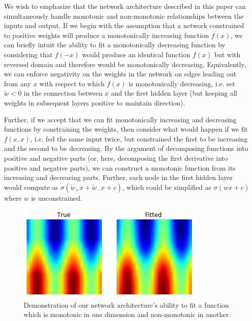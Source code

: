     We wish to emphasize that the network architecture described in this paper can simultaneously handle monotonic and non-monotonic relationships between the inputs and output. If we begin with the assumption that a network constrained to positive weights will produce a monotonically increasing function $f(x)$, we can briefly intuit the ability to fit a monotonically decreasing function by considering that $f(-x)$ would produce an identical function $f(x)$ but with reversed domain and therefore would be monotonically decreasing. Equivalently, we can enforce negativity on the weights in the network on edges leading out from any $x$ with respect to which $f(x)$ is monotonically decreasing, i.e. set $\tilde{w} < 0$ in the connection between $x$ and the first hidden layer (but keeping all weights in subsequent layers positive to maintain direction).  
    
    Further, if we accept that we can fit monotonically increasing and decreasing functions by constraining the weights, then consider what would happen if we fit $f(x, x)$, i.e. fed the same input twice, but constrained the first to be increasing and the second to be decreasing.  By the argument of decomposing functions into positive and negative parts (or, here, decomposing the first derivative into positive and negative parts), we can construct a monotonic function from its increasing and decreasing parts.  Further, each node in the first hidden layer would compute as $\sigma(\tilde{w}_{+} x + \tilde{w}_{-} x + c)$, which could be simplified as $\sigma(w x + c)$ where $w$ is unconstrained. 
    
    \begin{figure}
        \centering
        \includegraphics[width=.8\textwidth]{fig_monofair/mixed_monotonicity_demo_1.png}
        \caption{Demonstration of our network architecture's ability to fit a function which is monotonic in one dimension and non-monotonic in another. }
        \label{fig:demo1}
    \end{figure}
        
